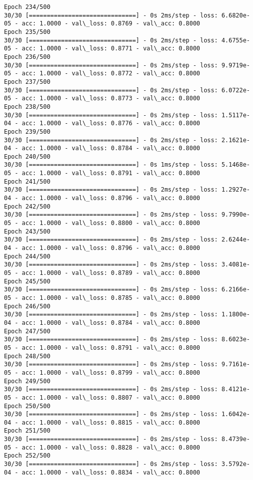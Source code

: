 \documentclass[11pt]{article}
\begin{document}
\begin{Verbatim}[commandchars=\\\{\}]
Epoch 234/500
30/30 [==============================] - 0s 2ms/step - loss: 6.6820e-05 - acc: 1.0000 - val\_loss: 0.8769 - val\_acc: 0.8000
Epoch 235/500
30/30 [==============================] - 0s 2ms/step - loss: 4.6755e-05 - acc: 1.0000 - val\_loss: 0.8771 - val\_acc: 0.8000
Epoch 236/500
30/30 [==============================] - 0s 2ms/step - loss: 9.9719e-05 - acc: 1.0000 - val\_loss: 0.8772 - val\_acc: 0.8000
Epoch 237/500
30/30 [==============================] - 0s 2ms/step - loss: 6.0722e-05 - acc: 1.0000 - val\_loss: 0.8773 - val\_acc: 0.8000
Epoch 238/500
30/30 [==============================] - 0s 2ms/step - loss: 1.5117e-04 - acc: 1.0000 - val\_loss: 0.8776 - val\_acc: 0.8000
Epoch 239/500
30/30 [==============================] - 0s 2ms/step - loss: 2.1621e-04 - acc: 1.0000 - val\_loss: 0.8784 - val\_acc: 0.8000
Epoch 240/500
30/30 [==============================] - 0s 1ms/step - loss: 5.1468e-05 - acc: 1.0000 - val\_loss: 0.8791 - val\_acc: 0.8000
Epoch 241/500
30/30 [==============================] - 0s 2ms/step - loss: 1.2927e-04 - acc: 1.0000 - val\_loss: 0.8796 - val\_acc: 0.8000
Epoch 242/500
30/30 [==============================] - 0s 2ms/step - loss: 9.7990e-05 - acc: 1.0000 - val\_loss: 0.8800 - val\_acc: 0.8000
Epoch 243/500
30/30 [==============================] - 0s 2ms/step - loss: 2.6244e-04 - acc: 1.0000 - val\_loss: 0.8796 - val\_acc: 0.8000
Epoch 244/500
30/30 [==============================] - 0s 2ms/step - loss: 3.4081e-05 - acc: 1.0000 - val\_loss: 0.8789 - val\_acc: 0.8000
Epoch 245/500
30/30 [==============================] - 0s 2ms/step - loss: 6.2166e-05 - acc: 1.0000 - val\_loss: 0.8785 - val\_acc: 0.8000
Epoch 246/500
30/30 [==============================] - 0s 2ms/step - loss: 1.1800e-04 - acc: 1.0000 - val\_loss: 0.8784 - val\_acc: 0.8000
Epoch 247/500
30/30 [==============================] - 0s 2ms/step - loss: 8.6023e-05 - acc: 1.0000 - val\_loss: 0.8791 - val\_acc: 0.8000
Epoch 248/500
30/30 [==============================] - 0s 2ms/step - loss: 9.7161e-05 - acc: 1.0000 - val\_loss: 0.8799 - val\_acc: 0.8000
Epoch 249/500
30/30 [==============================] - 0s 2ms/step - loss: 8.4121e-05 - acc: 1.0000 - val\_loss: 0.8807 - val\_acc: 0.8000
Epoch 250/500
30/30 [==============================] - 0s 2ms/step - loss: 1.6042e-04 - acc: 1.0000 - val\_loss: 0.8815 - val\_acc: 0.8000
Epoch 251/500
30/30 [==============================] - 0s 2ms/step - loss: 8.4739e-05 - acc: 1.0000 - val\_loss: 0.8828 - val\_acc: 0.8000
Epoch 252/500
30/30 [==============================] - 0s 2ms/step - loss: 3.5792e-04 - acc: 1.0000 - val\_loss: 0.8834 - val\_acc: 0.8000

\end{Verbatim}
\end{document}

